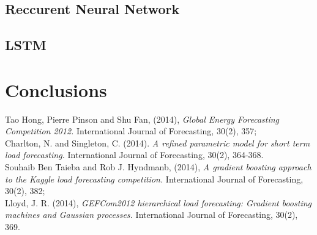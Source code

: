 \documentclass{article} %
\begin{document}
\subsection{Reccurent Neural Network}
\label{sec:nn/rnn}

\subsection{LSTM}
\label{sec:nn/lstm}


\section{Conclusions}




\begin{thebibliography}{9}

\small{


Tao Hong, Pierre Pinson and Shu Fan, 
(2014), 
{\it Global Energy Forecasting Competition 2012.}
International Journal of Forecasting, 30(2), 357;
\\
Charlton, N. and Singleton, C. 
(2014). 
{\it A refined parametric model for short term load forecasting.}
International Journal of Forecasting,
30(2), 364-368.
\\
Souhaib Ben Taieba and Rob J. Hyndmanb,
(2014), 
{\it A gradient boosting approach to the Kaggle load forecasting 
competition.}
International Journal of Forecasting, 30(2), 382;
\\
Lloyd, J. R. (2014), 
{\it GEFCom2012 hierarchical load forecasting: Gradient boosting machines and Gaussian processes. }
International Journal of Forecasting, 30(2), 369.


}

\end{thebibliography}
\end{document}

